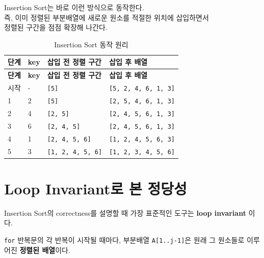 \documentclass[
  korean,
]{article}
\begin{document}
Insertion Sort는 바로 이런 방식으로 동작한다.\\
즉, 이미 정렬된 부분배열에 새로운 원소를 적절한 위치에 삽입하면서\\
정렬된 구간을 점점 확장해 나간다.

\begin{longtable}[]{@{}llll@{}}
\caption{Insertion Sort 동작 원리}\tabularnewline
\toprule\noalign{}
\textbf{단계} & \textbf{key} & \textbf{삽입 전 정렬 구간} & \textbf{삽입
후 배열} \\
\midrule\noalign{}
\endfirsthead
\toprule\noalign{}
\textbf{단계} & \textbf{key} & \textbf{삽입 전 정렬 구간} & \textbf{삽입
후 배열} \\
\midrule\noalign{}
\endhead
\bottomrule\noalign{}
\endlastfoot
시작 & - & \texttt{{[}5{]}} & \texttt{{[}5,\ 2,\ 4,\ 6,\ 1,\ 3{]}} \\
1 & 2 & \texttt{{[}5{]}} & \texttt{{[}2,\ 5,\ 4,\ 6,\ 1,\ 3{]}} \\
2 & 4 & \texttt{{[}2,\ 5{]}} & \texttt{{[}2,\ 4,\ 5,\ 6,\ 1,\ 3{]}} \\
3 & 6 & \texttt{{[}2,\ 4,\ 5{]}} &
\texttt{{[}2,\ 4,\ 5,\ 6,\ 1,\ 3{]}} \\
4 & 1 & \texttt{{[}2,\ 4,\ 5,\ 6{]}} &
\texttt{{[}1,\ 2,\ 4,\ 5,\ 6,\ 3{]}} \\
5 & 3 & \texttt{{[}1,\ 2,\ 4,\ 5,\ 6{]}} &
\texttt{{[}1,\ 2,\ 3,\ 4,\ 5,\ 6{]}} \\
\end{longtable}

\section{Loop Invariant로 본
정당성}\label{loop-invariantuxb85c-uxbcf8-uxc815uxb2f9uxc131}

Insertion Sort의 correctness를 설명할 때 가장 표준적인 도구는
\textbf{loop invariant} 이다.

\begin{tcolorbox}[enhanced jigsaw, arc=.35mm, bottomrule=.15mm, bottomtitle=1mm, breakable, colback=white, colbacktitle=quarto-callout-important-color!10!white, colframe=quarto-callout-important-color-frame, coltitle=black, left=2mm, leftrule=.75mm, opacityback=0, opacitybacktitle=0.6, rightrule=.15mm, title=\textcolor{quarto-callout-important-color}{\faExclamation}\hspace{0.5em}{Loop Invariant}, titlerule=0mm, toprule=.15mm, toptitle=1mm]

\texttt{for} 반복문의 각 반복이 시작될 때마다, 부분배열
\texttt{A{[}1..j-1{]}}은 원래 그 원소들로 이루어진 \textbf{정렬된
배열}이다.\\

\end{tcolorbox}
\end{document}
